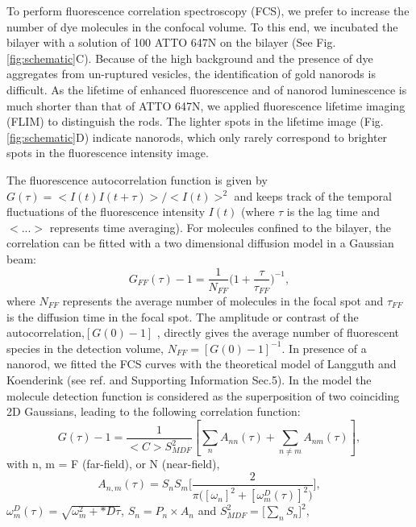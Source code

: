 To perform fluorescence correlation spectroscopy (FCS), we prefer to increase the number of dye molecules in the confocal volume.
To this end, we incubated the bilayer with a solution of \SI{100}{\nM} ATTO 647N on the bilayer (See Fig. \ref{fig:schematic}C).
Because of the high background and the presence of dye aggregates from un-ruptured vesicles, the identification of gold nanorods is difficult.
As the lifetime of enhanced fluorescence and of nanorod luminescence is much shorter than that of ATTO 647N, we applied fluorescence lifetime imaging (FLIM) to distinguish the rods.
The lighter spots in the lifetime image (Fig.\ref{fig:schematic}D) indicate nanorods, which only rarely correspond to brighter spots in the fluorescence intensity image.

The fluorescence autocorrelation function is given by $G(\tau)=<I(t)I(t+\tau)>/<I(t)>^2$ and keeps track of the temporal fluctuations of the fluorescence intensity $I(t)$ (where $\tau$ is the lag time and $<...>$ represents time averaging).
For molecules confined to the bilayer, the correlation can be fitted with a two dimensional diffusion model in a Gaussian beam:
\begin{equation}
	G_{FF}(\tau)-1 = \frac{1}{N_{FF}}\bigg(1+\frac{\tau}{\tau_{FF}} \bigg)^{-1},
	\label{eq:2D-gauss-diffusion}
\end{equation}
where $N_{FF}$ represents the average number of molecules in the focal spot and $\tau_{FF}$ is the diffusion time in the focal spot.
The amplitude or contrast of the autocorrelation,$[G(0)-1]$ , directly gives the average number of fluorescent species in the detection volume, $N_{FF}=[G(0)-1]^{-1}$.
In presence of a nanorod, we fitted the FCS curves with the theoretical model of Langguth and Koenderink (see ref.\cite{langguth2014simple} and Supporting Information Sec.5).
In the model the molecule detection function is considered as the superposition of two coinciding 2D Gaussians, leading to the following correlation function:
\begin{equation}
	G(\tau)-1 = \frac{1}{<C>S_{MDF}^2}[\sum_{n}A_{nn}(\tau) + \sum_{n\neq m}A_{nm}(\tau)],
	\label{eqm:far-near-gauss}
\end{equation}
with n, m = F (far-field), or N (near-field),
\begin{equation}
	A_{n,m}(\tau)=S_nS_m\Bigg[\frac{2}{\pi\Big([\omega_n]^2 + [\omega_m^D(\tau)]^2 \Big)}\Bigg] ,
	\label{eqm:area-gauss}
\end{equation}
$\omega_m^D(\tau)=\sqrt{\omega_m^2 + *D\tau}$, $S_n=P_n\times A_n$ and $S_{MDF}^2=\Big[\sum_{n}S_n\Big]^2$,

